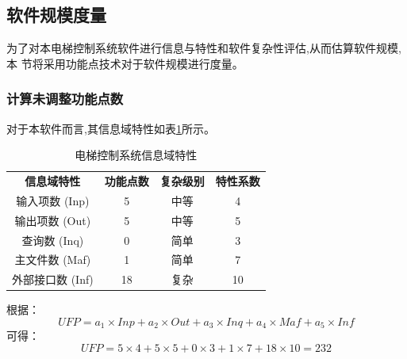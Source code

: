 \subsection{软件规模度量}
为了对本电梯控制系统软件进行信息与特性和软件复杂性评估,从而估算软件规模,本
节将采用功能点技术对于软件规模进行度量。\par

\subsubsection{计算未调整功能点数}
对于本软件而言,其信息域特性如表\ref{tab:functionpoint}所示。\par
\begin{table}[H]
	\centering
	\caption{电梯控制系统信息域特性}
	\label{tab:functionpoint}
	\begin{tabular}{c c c c}
		\toprule
		\multicolumn{1}{c}{\textbf{信息域特性}} &
		\multicolumn{1}{c}{\textbf{功能点数}} &
		\multicolumn{1}{c}{\textbf{复杂级别}} &
		\multicolumn{1}{c}{\textbf{特性系数}} \\
		\cmidrule(lr){1-1} \cmidrule(lr){2-2} \cmidrule(lr){3-3} \cmidrule(lr){4-4}

		输入项数 (Inp) & 5 & 中等 & 4 \\
		输出项数 (Out) & 5 & 中等 & 5 \\
		查询数 (Inq) & 0 & 简单 & 3 \\
		主文件数 (Maf) & 1 & 简单 & 7 \\
		外部接口数 (Inf) & 18 & 复杂 & 10 \\
		\bottomrule
	\end{tabular}
\end{table}
根据：
\begin{equation}
	\label{equ:ufp}
	UFP = a_1\times Inp + a_2\times Out + a_3\times Inq + a_4\times Maf + a_5\times Inf
\end{equation}
可得：
\begin{equation}
	\label{equ:ufp2}
	UFP = 5\times 4 + 5\times 5 + 0\times 3 + 1\times 7 + 18\times 10 = 232
\end{equation}

